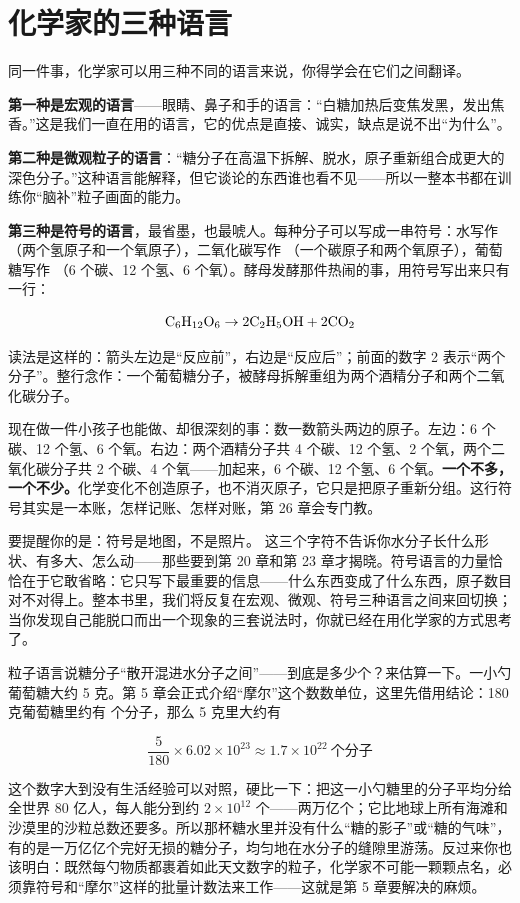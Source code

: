 \section{化学家的三种语言}

同一件事，化学家可以用三种不同的语言来说，你得学会在它们之间翻译。

\textbf{第一种是宏观的语言}——眼睛、鼻子和手的语言：“白糖加热后变焦发黑，发出焦香。”这是我们一直在用的语言，它的优点是直接、诚实，缺点是说不出“为什么”。

\textbf{第二种是微观粒子的语言}：“糖分子在高温下拆解、脱水，原子重新组合成更大的深色分子。”这种语言能解释，但它谈论的东西谁也看不见——所以一整本书都在训练你“脑补”粒子画面的能力。

\textbf{第三种是符号的语言}，最省墨，也最唬人。每种分子可以写成一串符号：水写作 （两个氢原子和一个氧原子），二氧化碳写作 （一个碳原子和两个氧原子），葡萄糖写作 （6 个碳、12 个氢、6 个氧）。酵母发酵那件热闹的事，用符号写出来只有一行：

\[\mathrm{C_6H_{12}O_6} \rightarrow 2\mathrm{C_2H_5OH} + 2\mathrm{CO_2}\]

读法是这样的：箭头左边是“反应前”，右边是“反应后”；前面的数字 2 表示“两个分子”。整行念作：一个葡萄糖分子，被酵母拆解重组为两个酒精分子和两个二氧化碳分子。

现在做一件小孩子也能做、却很深刻的事：数一数箭头两边的原子。左边：6 个碳、12 个氢、6 个氧。右边：两个酒精分子共 4 个碳、12 个氢、2 个氧，两个二氧化碳分子共 2 个碳、4 个氧——加起来，6 个碳、12 个氢、6 个氧。\textbf{一个不多，一个不少。}化学变化不创造原子，也不消灭原子，它只是把原子重新分组。这行符号其实是一本账，怎样记账、怎样对账，第 26 章会专门教。

要提醒你的是：符号是地图，不是照片。 这三个字符不告诉你水分子长什么形状、有多大、怎么动——那些要到第 20 章和第 23 章才揭晓。符号语言的力量恰恰在于它敢省略：它只写下最重要的信息——什么东西变成了什么东西，原子数目对不对得上。整本书里，我们将反复在宏观、微观、符号三种语言之间来回切换；当你发现自己能脱口而出一个现象的三套说法时，你就已经在用化学家的方式思考了。

\begin{qiaoliang}
粒子语言说糖分子“散开混进水分子之间”——到底是多少个？来估算一下。一小勺葡萄糖大约 5 克。第 5 章会正式介绍“摩尔”这个数数单位，这里先借用结论：180 克葡萄糖里约有  个分子，那么 5 克里大约有

\[\frac{5}{180}\times 6.02\times 10^{23}\approx 1.7\times 10^{22}\ \text{个分子}\]

这个数字大到没有生活经验可以对照，硬比一下：把这一小勺糖里的分子平均分给全世界 80 亿人，每人能分到约 $2\times 10^{12}$ 个——两万亿个；它比地球上所有海滩和沙漠里的沙粒总数还要多。所以那杯糖水里并没有什么“糖的影子”或“糖的气味”，有的是一万亿亿个完好无损的糖分子，均匀地在水分子的缝隙里游荡。反过来你也该明白：既然每勺物质都裹着如此天文数字的粒子，化学家不可能一颗颗点名，必须靠符号和“摩尔”这样的批量计数法来工作——这就是第 5 章要解决的麻烦。
\end{qiaoliang}

